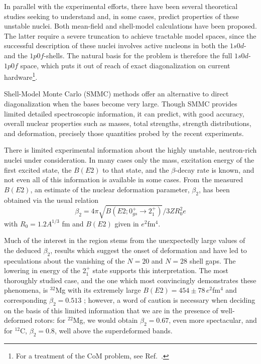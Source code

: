 \documentclass[twoside,12pt]{article}
\begin{document}
In parallel with the experimental efforts, there have been several
theoretical studies seeking to understand and, in some cases, predict
properties of these unstable nuclei.  Both mean-field
\cite{r:werner,r:campi} and shell-model calculations
\cite{r:brown1,r:brown2,r:wbmb,r:poves1,r:fukunishi,r:retamosa,r:caurier}
have been proposed. The latter require a severe truncation to
achieve tractable model spaces, since the successful description of these
nuclei involves active nucleons in both the $1s0d$- and the $1p0f$-shells.
The natural basis for the problem is therefore the full $1s0d$-$1p0f$
space, which puts it out of reach of exact diagonalization on current
hardware\footnote{For a treatment of the CoM problem, see Ref.\
\cite{drhklz99}.}.

Shell-Model Monte Carlo (SMMC) methods
\cite{r:smmc_pr,r:smmc_ar,r:lang} offer an alternative to direct
diagonalization when the bases become very large. Though SMMC provides
limited detailed spectroscopic information, it can predict, with good
accuracy, overall nuclear properties such as masses, total strengths,
strength distributions, and deformation, precisely those quantities
probed by the recent experiments.


There is limited experimental information about the highly unstable,
neutron-rich nuclei under consideration.  In many cases only the mass,
excitation energy of the first excited state, the $B(E2)$ to that state,
and the $\beta$-decay rate is known, and not even all of this
information is available in some cases.  From the
measured $B(E2)$, an estimate of the nuclear deformation parameter,
$\beta_2$, has been obtained via the usual relation
\begin{equation}
\beta_2 = 4 \pi \sqrt{B(E2; 0^+_{gs} \rightarrow 2^+_1)}/3 Z R_0^2 e
\end{equation}
with $R_0 = 1.2 A^{1/3}$ fm and $B(E2)$ given in $e^2$fm$^4$.

Much of the interest in the region stems from the unexpectedly large
values of the deduced $\beta_2$, results which suggest the onset of
deformation and have led to speculations about the vanishing of the $N
= 20$ and $N = 28$ shell gaps.  The lowering in energy of the 2$^+_1$
state supports this interpretation.  The most thoroughly studied case,
and the one which most convincingly demonstrates these phenomena, is
$^{32}$Mg with its extremely large $B(E2) = 454 \pm 78 \, e^2$fm$^4$ and
corresponding $\beta_2 = 0.513$ \cite{r:motobayashi}; however, a word of
caution is necessary when deciding on the basis of this
limited information that we are in the presence of well-deformed
rotors: for $^{22}$Mg, we would obtain $\beta_2 = 0.67$, even more
spectacular, and for $^{12}$C, $\beta_2 = 0.8$, well above the
superdeformed bands.
\end{document}
